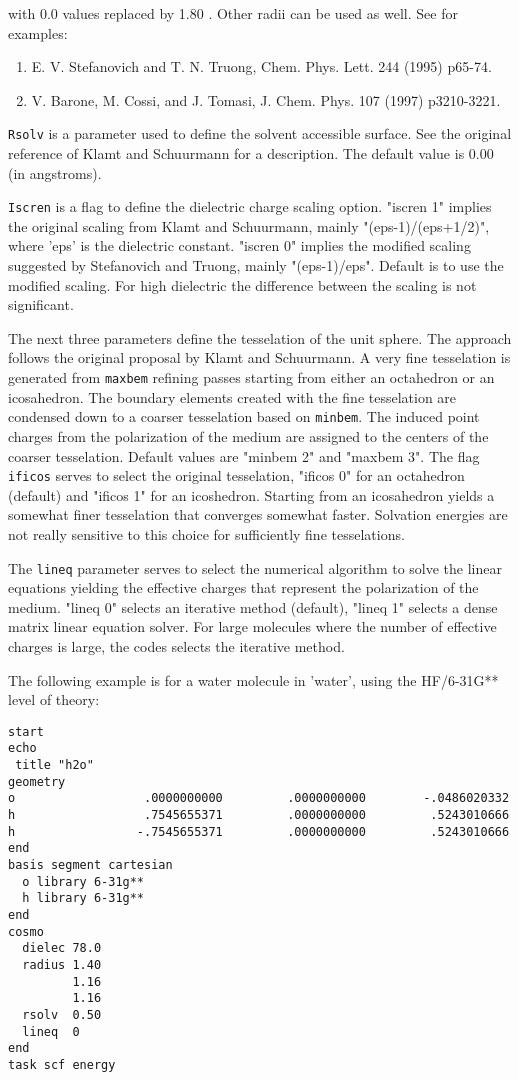 with 0.0 values replaced by 1.80 . Other radii can be used as well.
See for examples:

\begin{enumerate}
\item E. V. Stefanovich and T. N. Truong, Chem. Phys. Lett. 244 (1995)
p65-74.
\item V. Barone, M. Cossi, and J. Tomasi, J. Chem. Phys. 107 (1997)
p3210-3221.
\end{enumerate}

\verb+Rsolv+ is a parameter used to define the solvent accessible
surface. See the original reference of Klamt and Schuurmann for a
description. The default value is 0.00 (in angstroms).

\verb+Iscren+ is a flag to define the dielectric charge scaling option.
"iscren 1" implies the original scaling from Klamt and Schuurmann,
mainly "(eps-1)/(eps+1/2)", where 'eps' is the dielectric constant.
"iscren 0" implies the modified scaling suggested by Stefanovich and
Truong, mainly "(eps-1)/eps". Default is to use the modified scaling.
For high dielectric the difference between the scaling is not 
significant.

The next three parameters define the tesselation of the unit sphere.
The approach follows the original proposal by Klamt and Schuurmann.
A very fine tesselation is generated from \verb+maxbem+ refining 
passes starting from either an octahedron or an icosahedron. The
boundary elements created with the fine tesselation are condensed
down to a coarser tesselation based on \verb+minbem+. The induced
point charges from the polarization of the medium are assigned to
the centers of the coarser tesselation. Default values are
"minbem 2" and "maxbem 3". The flag \verb+ificos+ serves to
select the original tesselation, "ificos 0" for an octahedron
(default) and "ificos 1" for an icoshedron. Starting from an icosahedron
yields a somewhat finer tesselation that converges somewhat faster.
Solvation energies are not really sensitive to this choice for
sufficiently fine tesselations.

The \verb+lineq+ parameter serves to select the numerical algorithm to solve
the linear equations yielding the effective charges that represent
the polarization of the medium. "lineq 0" selects an iterative method 
(default), "lineq 1" selects a dense matrix linear equation solver.
For large molecules where the number of effective charges is large,
the codes selects the iterative method.

The following example is for a water molecule in 'water', using
the HF/6-31G** level of theory:

\begin{verbatim}
start
echo
 title "h2o"
geometry
o                  .0000000000         .0000000000        -.0486020332
h                  .7545655371         .0000000000         .5243010666
h                 -.7545655371         .0000000000         .5243010666
end
basis segment cartesian
  o library 6-31g**
  h library 6-31g**
end
cosmo
  dielec 78.0
  radius 1.40
         1.16
         1.16
  rsolv  0.50
  lineq  0
end
task scf energy
\end{verbatim}
